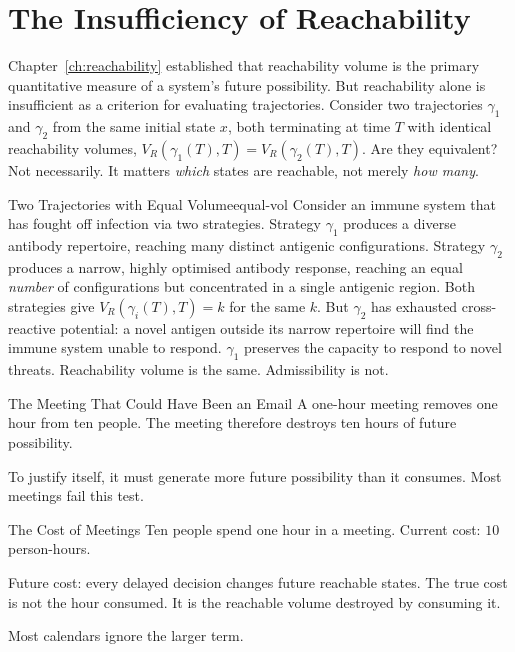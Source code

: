 \documentclass[12pt,twoside,openright]{book}
\newcommand{\bioicon}{\marginpar{\tiny\color{DistTeal}\faDna}}
\begin{document}
\section{The Insufficiency of Reachability}
\label{sec:ch14-insufficiency}

Chapter~\ref{ch:reachability} established that reachability
volume is the primary quantitative measure of a system's
future possibility. But reachability alone is insufficient
as a criterion for evaluating trajectories. Consider two
trajectories $\gamma_1$ and $\gamma_2$ from the same initial
state $x$, both terminating at time $T$ with identical
reachability volumes,
$V_R(\gamma_1(T),T) = V_R(\gamma_2(T),T)$. Are they
equivalent? Not necessarily. It matters \emph{which} states
are reachable, not merely \emph{how many}.

\begin{example}{Two Trajectories with Equal Volume}{equal-vol}
  \bioicon
  Consider an immune system that has fought off infection
  via two strategies. Strategy $\gamma_1$ produces a diverse
  antibody repertoire, reaching many distinct antigenic
  configurations. Strategy $\gamma_2$ produces a narrow,
  highly optimised antibody response, reaching an equal
  \emph{number} of configurations but concentrated in a
  single antigenic region. Both strategies give
  $V_R(\gamma_i(T),T)=k$ for the same $k$. But $\gamma_2$
  has exhausted cross-reactive potential: a novel antigen
  outside its narrow repertoire will find the immune system
  unable to respond. $\gamma_1$ preserves the capacity to
  respond to novel threats. Reachability volume is the
  same. Admissibility is not.
\end{example}

\begin{distinctionaside}{The Meeting That Could Have Been an
  Email}
A one-hour meeting removes one hour from ten people. The
meeting therefore destroys ten hours of future possibility.

To justify itself, it must generate more future possibility
than it consumes. Most meetings fail this test.
\end{distinctionaside}

\begin{envelopeaside}{The Cost of Meetings}
Ten people spend one hour in a meeting. Current cost:
$10$ person-hours.

Future cost: every delayed decision changes future reachable
states. The true cost is not the hour consumed. It is the
reachable volume destroyed by consuming it.

Most calendars ignore the larger term.
\end{envelopeaside}
\end{document}
